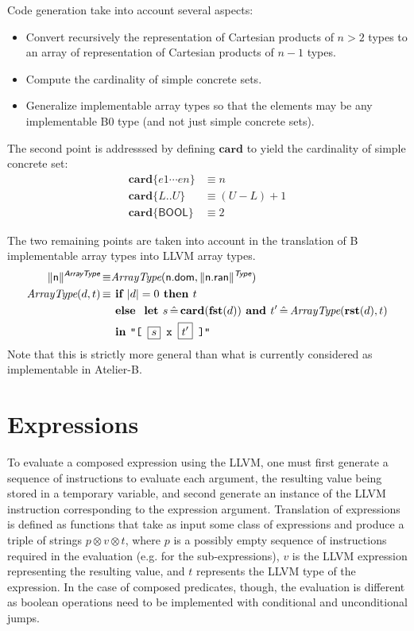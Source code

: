 \documentclass{llncs}
\newcommand{\trad}[2]{\ensuremath{\lVert \textsf{#1} \rVert^{\textit{#2}}}}
\DeclareMathOperator{\isdef}{\equiv}
\newcommand{\llvm}[1]{\texttt{#1}}
\newcommand{\B}[1]{\textsf{#1}}
\newcommand{\IF}[0]{\textbf{ if }}
\newcommand{\ELSE}[0]{\textbf{ else }}
\newcommand{\THEN}[0]{\textbf{ then }}
\newcommand{\LET}[0]{\textbf{ let }}
\DeclareMathOperator{\BE}{\hat{=}}
\newcommand{\IN}[0]{\textbf{ in }}
\newcommand{\AND}[0]{\textbf{ and }}
\newcommand{\PH}[1]{\framebox{$#1$}}
\newcommand{\sep}[0]{\otimes}
\begin{document}
Code generation take into account several aspects:
\begin{itemize}
\item Convert recursively the representation of Cartesian products of
  $n>2$ types to an array of representation of Cartesian products of
  $n-1$ types.
\item Compute the cardinality of simple concrete sets.
\item Generalize implementable array types so that the elements may be
  any implementable B0 type (and not just simple concrete sets).
\end{itemize}

\newcommand{\card}[0]{\mathbf{card}}
\newcommand{\twodots}[0]{..}

The second point is addresssed by defining $\card$ to yield the
cardinality of simple concrete set:
\begin{align*}
  \card \{ e1 \cdots en \} &\isdef n \\
  \card \{ L \twodots U \} &\isdef (U - L) + 1 \\
  \card \{ \B{BOOL} \} &\isdef 2
\end{align*}

The two remaining points are taken into account in the translation of
B implementable array types into LLVM array types.
\begin{align*}
  \trad{n}{\B{ArrayType}} \isdef & \textit{ArrayType}(\B{n.dom}, \trad{n.ran}{\B{Type}}) \\
  \textit{ArrayType}(d, t) \isdef & \IF |d| = 0 \THEN t \\
  & \ELSE \LET s \BE \card(\fst(d)) \AND t' \BE \textit{ArrayType}(\rst(d), t) \\
  & \IN \llvm{"[ \PH{s} x \PH{t'} ]"}
\end{align*}
Note that this is strictly more general than what is currently
considered as implementable in Atelier-B.

\section{Expressions}
\label{sec:expr}

To evaluate a composed expression using the LLVM, one must first generate a
sequence of instructions to evaluate each argument, the resulting value being
stored in a temporary variable, and second generate an instance of the LLVM
instruction corresponding to the expression argument.  Translation of
expressions is defined as functions that take as input some class of expressions
and produce a triple of strings $p \sep v \sep t$, where $p$ is a possibly empty
sequence of instructions required in the evaluation (e.g.  for the
sub-expressions), $v$ is the LLVM expression representing the resulting value,
and $t$ represents the LLVM type of the expression. In the case of composed
predicates, though, the evaluation is different as boolean operations need to be
implemented with conditional and unconditional jumps.
\end{document}
